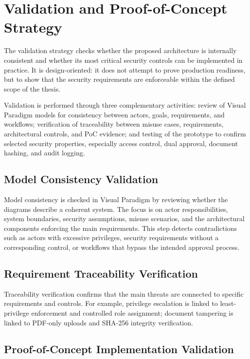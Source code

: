 \documentclass[12pt,a4paper]{report}
\begin{document}
\section{Validation and Proof-of-Concept Strategy}

The validation strategy checks whether the proposed architecture is internally consistent and whether its most critical security controls can be implemented in practice. It is design-oriented: it does not attempt to prove production readiness, but to show that the security requirements are enforceable within the defined scope of the thesis.

Validation is performed through three complementary activities: review of Visual Paradigm models for consistency between actors, goals, requirements, and workflows; verification of traceability between misuse cases, requirements, architectural controls, and PoC evidence; and testing of the prototype to confirm selected security properties, especially access control, dual approval, document hashing, and audit logging.

\subsection{Model Consistency Validation}

Model consistency is checked in Visual Paradigm by reviewing whether the diagrams describe a coherent system. The focus is on actor responsibilities, system boundaries, security assumptions, misuse scenarios, and the architectural components enforcing the main requirements. This step detects contradictions such as actors with excessive privileges, security requirements without a corresponding control, or workflows that bypass the intended approval process.

\subsection{Requirement Traceability Verification}

Traceability verification confirms that the main threats are connected to specific requirements and controls. For example, privilege escalation is linked to least-privilege enforcement and controlled role assignment; document tampering is linked to PDF-only uploads and SHA-256 integrity verification.

\subsection{Proof-of-Concept Implementation Validation}
\end{document}

